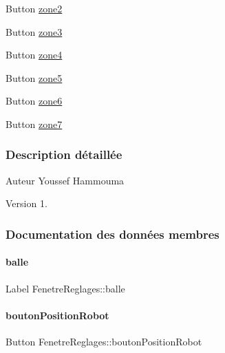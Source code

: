 \begin{DoxyCompactItemize}
\item 
Button \hyperlink{class_fenetre_reglages_a8acb59ea8ba6a19ee095b01ab8ced13f}{zone2}
\item 
Button \hyperlink{class_fenetre_reglages_ae615f383711801590b5b8042c608ace0}{zone3}
\item 
Button \hyperlink{class_fenetre_reglages_a40a6ef6307a2d336bb7a18d80804a75d}{zone4}
\item 
Button \hyperlink{class_fenetre_reglages_a530cbc3f636c8d6be873c0a9c3f1ad8f}{zone5}
\item 
Button \hyperlink{class_fenetre_reglages_ac49309736faea8e1ed1f548a66bef1cd}{zone6}
\item 
Button \hyperlink{class_fenetre_reglages_a56048291237429ab66220b9d85b18d53}{zone7}
\end{DoxyCompactItemize}


\subsubsection{Description détaillée}
\begin{DoxyAuthor}{Auteur}
Youssef Hammouma
\end{DoxyAuthor}
\begin{DoxyVersion}{Version}
1. 
\end{DoxyVersion}


\subsubsection{Documentation des données membres}
\mbox{\label{class_fenetre_reglages_aedfba3f829a90409b052cf404407a42d}} 
\paragraph{\texorpdfstring{balle}{balle}}
{\footnotesize\ttfamily Label Fenetre\+Reglages\+::balle\hspace{0.3cm}{\ttfamily [private]}}

\mbox{\label{class_fenetre_reglages_acf9b060a552f6502635527be049e6138}} 
\paragraph{\texorpdfstring{bouton\+Position\+Robot}{boutonPositionRobot}}
{\footnotesize\ttfamily Button Fenetre\+Reglages\+::bouton\+Position\+Robot\hspace{0.3cm}{\ttfamily [private]}}

